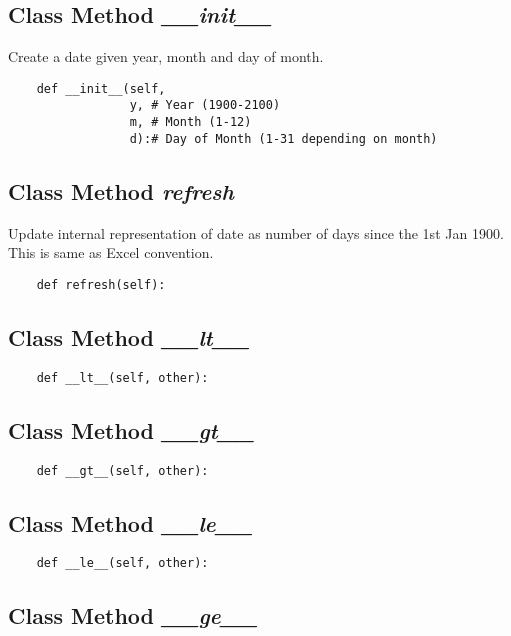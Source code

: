 \documentclass[twoside,11pt]{book}
\begin{document}
\subsection{Class Method {\it \_\_init\_\_}}
Create a date given year, month and day of month. 

\begin{lstlisting}
    def __init__(self, 
                 y, # Year (1900-2100)
                 m, # Month (1-12)
                 d):# Day of Month (1-31 depending on month)
\end{lstlisting}

\subsection{Class Method {\it refresh}}
Update internal representation of date as number of days since the 1st Jan 1900. This is same as Excel convention. 

\begin{lstlisting}
    def refresh(self):
\end{lstlisting}

\subsection{Class Method {\it \_\_lt\_\_}}


\begin{lstlisting}
    def __lt__(self, other):
\end{lstlisting}

\subsection{Class Method {\it \_\_gt\_\_}}


\begin{lstlisting}
    def __gt__(self, other):
\end{lstlisting}

\subsection{Class Method {\it \_\_le\_\_}}


\begin{lstlisting}
    def __le__(self, other):
\end{lstlisting}

\subsection{Class Method {\it \_\_ge\_\_}}
\end{document}
